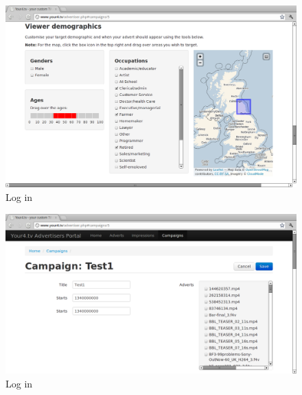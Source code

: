 \begin{figure}[th]
	\centering
	\includegraphics[width=\textwidth]{images/screenshots/advertiser-campaign-demographics.png}
	\caption{Log in}
	\label{fig:advertiser-campaign-demographics}
\end{figure}
\begin{figure}[th]
	\centering
	\includegraphics[width=\textwidth]{images/screenshots/advertiser-campaign.png}
	\caption{Log in}
	\label{fig:advertiser-campaign}
\end{figure}
